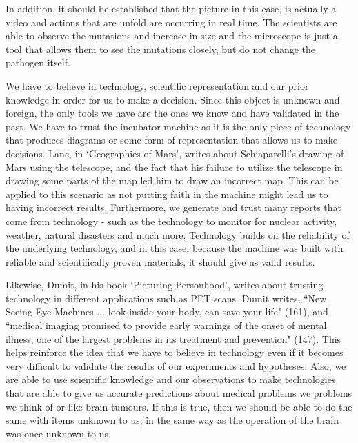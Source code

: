 \documentclass[11pt, oneside]{article}
\begin{document}
\par In addition, it should be established that the picture in this case, is actually a video and actions that are unfold are occurring in real time. The scientists are able to observe the mutations and increase in size and the microscope is just a tool that allows them to see the mutations closely, but do not change the pathogen itself.

\par We have to believe in technology, scientific representation and our prior knowledge in order for us to make a decision. Since this object is unknown and foreign, the only tools we have are the ones we know and have validated in the past. We have to trust the incubator machine as it is the only piece of technology that produces diagrams or some form of representation that allows us to make decisions. Lane, in `Geographies of Mars', writes about Schiaparelli's drawing of Mars using the telescope, and the fact that his failure to utilize the telescope in drawing some parts of the map led him to draw an incorrect map. This can be applied to this scenario as not putting faith in the machine might lead us to having incorrect results. Furthermore, we generate and trust many reports that come from technology - such as the technology to monitor for nuclear activity, weather, natural disasters and much more. Technology builds on the reliability of the underlying technology, and in this case, because the machine was built with reliable and scientifically proven materials, it should give us valid results. 

\par Likewise, Dumit, in his book `Picturing Personhood', writes about trusting technology in different applications such as PET scans. Dumit writes, ``New Seeing-Eye Machines ... look inside your body, can save your life" (161), and ``medical imaging promised to provide early warnings of the onset of mental illness, one of the largest problems in its treatment and prevention" (147). This helps reinforce the idea that we have to believe in technology even if it becomes very difficult to validate the results of our experiments and hypotheses. Also, we are able to use scientific knowledge and our observations to make technologies that are able to give us accurate predictions about medical problems we problems we think of or like brain tumours. If this is true, then we should be able to do the same with items unknown to us, in the same way as the operation of the brain was once unknown to us.
\end{document}
